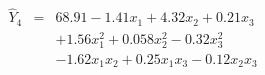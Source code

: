 

\[
\begin{array}{lll} \hat{Y}_{4} & = & 68.91 - 1.41x_1 + 4.32x_2 + 0.21x_3 \\ & & + 1.56x_{1}^2 + 0.058x_{2}^2 - 0.32x_{3}^2 \\ & & - 1.62x_{1}x_{2} + 0.25x_{1}x_{3} - 0.12x_{2}x_{3} \end{array}
\]


